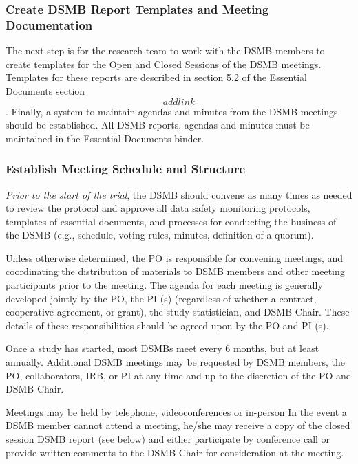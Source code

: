 \documentclass[]{book}
\begin{document}
\subsubsection{Create DSMB Report Templates and Meeting
Documentation}\label{create-dsmb-report-templates-and-meeting-documentation}

The next step is for the research team to work with the DSMB members to
create templates for the Open and Closed Sessions of the DSMB meetings.
Templates for these reports are described in section 5.2 of the
Essential Documents section \[add link\]. Finally, a system to maintain
agendas and minutes from the DSMB meetings should be established. All
DSMB reports, agendas and minutes must be maintained in the Essential
Documents binder.

\subsubsection{Establish Meeting Schedule and
Structure}\label{establish-meeting-schedule-and-structure}

\emph{Prior to the start of the trial}, the DSMB should convene as many
times as needed to review the protocol and approve all data safety
monitoring protocols, templates of essential documents, and processes
for conducting the business of the DSMB (e.g., schedule, voting rules,
minutes, definition of a quorum).

Unless otherwise determined, the PO is responsible for convening
meetings, and coordinating the distribution of materials to DSMB members
and other meeting participants prior to the meeting. The agenda for each
meeting is generally developed jointly by the PO, the PI (s) (regardless
of whether a contract, cooperative agreement, or grant), the study
statistician, and DSMB Chair. These details of these responsibilities
should be agreed upon by the PO and PI (s).

Once a study has started, most DSMBs meet every 6 months, but at least
annually. Additional DSMB meetings may be requested by DSMB members, the
PO, collaborators, IRB, or PI at any time and up to the discretion of
the PO and DSMB Chair.

Meetings may be held by telephone, videoconferences or in-person In the
event a DSMB member cannot attend a meeting, he/she may receive a copy
of the closed session DSMB report (see below) and either participate by
conference call or provide written comments to the DSMB Chair for
consideration at the meeting.
\end{document}

